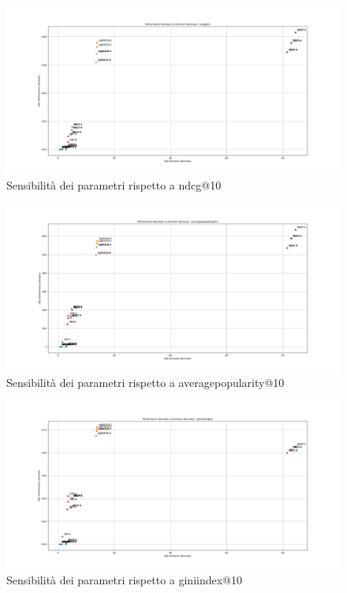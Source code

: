 \begin{figure}[H]
    \includegraphics[width=\textwidth]{images/sensibility_ndcg@10.png}
    \caption{Sensibilità dei parametri rispetto a ndcg@10}
\end{figure}

\begin{figure}[H]
    \includegraphics[width=\textwidth]{images/sensibility_averagepopularity@10.png}
    \caption{Sensibilità dei parametri rispetto a averagepopularity@10}
\end{figure}

\begin{figure}[H]
    \includegraphics[width=\textwidth]{images/sensibility_giniindex@10.png}
    \caption{Sensibilità dei parametri rispetto a giniindex@10}
\end{figure}

